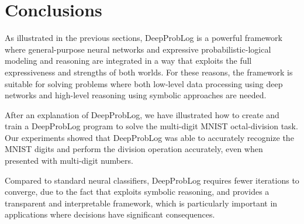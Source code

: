 \section{Conclusions}
\label{sec:conclusions}

As illustrated in the previous sections, DeepProbLog is a powerful framework where general-purpose neural
networks and expressive probabilistic-logical modeling and reasoning are integrated in a way that exploits the full expressiveness and strengths of both worlds. For these reasons, the framework is suitable for solving problems where both low-level data processing using deep networks and high-level reasoning using symbolic approaches are needed.

After an explanation of DeepProbLog, we have illustrated how to create and train a DeepProbLog program to solve the multi-digit MNIST octal-division task. Our experiments showed that DeepProbLog was able to accurately recognize the MNIST digits and perform the division operation accurately, even when presented with multi-digit numbers.

Compared to standard neural classifiers, DeepProbLog requires fewer iterations to converge, due to the fact that exploits symbolic reasoning, and provides a transparent and interpretable framework, which is particularly important in applications where decisions have significant consequences.






